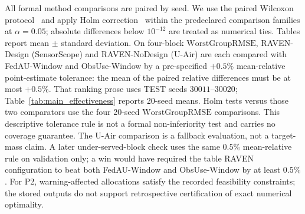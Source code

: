 All formal method comparisons are paired by seed.  We use the paired
Wilcoxon protocol~\cite{wilcoxon1945individual} and apply Holm
correction~\cite{holm1979simple} within the predeclared comparison
families at $\alpha=0.05$; absolute differences below
$10^{-12}$ are treated as numerical ties.  Tables report
mean $\pm$ standard deviation.  On four-block $\mathrm{WorstGroupRMSE}$,
RAVEN-Design (SensorScope) and RAVEN-NoDesign (U-Air) are each compared with FedAU-Window and ObsUse-Window by a
pre-specified $+0.5\%$ mean-relative point-estimate tolerance: the mean
of the paired relative differences must be at most $+0.5\%$.
That ranking prose uses TEST seeds $30011$--$30020$; Table~\ref{tab:main_effectiveness} reports 20-seed means.
Holm tests versus those two comparators use the four 20-seed
$\mathrm{WorstGroupRMSE}$ comparisons.
This descriptive tolerance rule is not a formal non-inferiority test
and carries no coverage guarantee.  The U-Air comparison is a fallback
evaluation, not a target-mass claim.  A later under-served-block check uses the same
$0.5\%$ mean-relative rule on validation only; a win would have required
the table RAVEN configuration to beat both FedAU-Window and ObsUse-Window by at least $0.5\%$.
For P2, warning-affected allocations satisfy
the recorded feasibility constraints; the stored outputs do not
support retrospective certification of exact numerical optimality.

